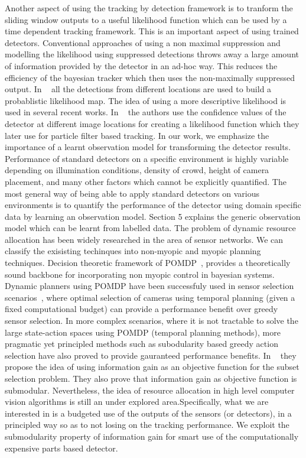 \documentclass[10pt,twocolumn,letterpaper]{article}
\begin{document}
Another aspect of using the tracking by detection framework is to tranform the sliding window outputs to a useful likelihood function which can be used by a time dependent tracking framework. This is an important aspect of using trained detectors. Conventional approaches of using a non maximal suppression and modelling the likelihood using suppressed detections throws away a large amount of information provided by the detector in an ad-hoc way. This reduces the efficiency of the bayesian tracker which then uses the non-maximally suppressed output. In ~\cite{POM-main} all the detections from different locations are used to build a probablistic likelihood map. The idea of using a more descriptive likelihood is used in several recent works. In ~\cite{Pami-11} the authors use the confidence values of the detector at different image locations for creating a likelihood function which they later use for particle filter based tracking. In our work, we emphasize the importance of a learnt observation model for transforming the detector results. Performance of standard detectors on a specific environment is highly variable depending on illumination conditions, density of crowd, height of camera placement, and many other factors which cannot be explicitly quantified. The most general way of being able to apply standard detectors on various environments is to quantify the performance of the detector using domain specific data by learning an observation model. Section 5 explains the generic observation model which can be learnt from labelled data.
The problem of dynamic resource allocation has been widely researched in the area of sensor networks. We can classify the exisisting techinques into non-myopic and myopic planning techniques. Decision theoretic framework of POMDP~\cite{Kaelbling98}, provides a theoretically sound backbone for incorporating non myopic control in bayesian systems. Dynamic planners using POMDP have been successfuly used in sensor selection scenarios~\cite{Spaan09}, where optimal selection of cameras using temporal planning (given a fixed computational budget) can provide a performance benefit over greedy sensor selection. In more complex scenarios, where it is not tractable to solve the large state-action spaces using POMDP (temporal planning methods), more pragmatic yet principled methods such as subodularity based greedy action selection have also proved to provide gauranteed performance benefits. In ~\cite{krause2012near} they propose the idea of using information gain as an objective function for the subset selection problem. They also prove that information gain as objective function is submodular. Nevertheless, the idea of resource allocation in high level computer vision algorithms is still an under explored area.Specifically, what we are interested in is a budgeted use of the outputs of the sensors (or detectors), in a principled way so as to not losing on the tracking performance. We exploit the submodularity property of information gain for smart use of the computationally expensive parts based detector.
\end{document}
